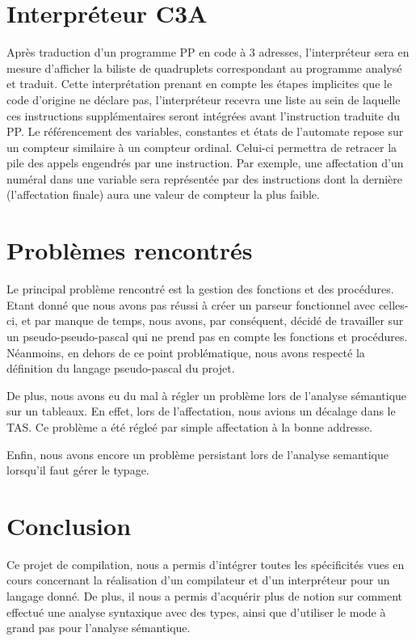\documentclass[11pt,a4paper]{article}
\begin{document}
\section{Interpréteur C3A}
Après traduction d'un programme PP en code à 3 adresses, l'interpréteur sera en mesure d'afficher la biliste de quadruplets correspondant au programme analysé et traduit.
Cette interprétation prenant en compte les étapes implicites que le code d'origine ne déclare pas, l'interpréteur recevra une liste au sein de laquelle ces instructions supplémentaires seront intégrées avant l'instruction traduite du PP.
Le référencement des variables, constantes et états de l'automate repose sur un compteur similaire à un compteur ordinal.
Celui-ci permettra de retracer la pile des appels engendrés par une instruction.
Par exemple, une affectation d'un numéral dans une variable sera représentée par des instructions dont la dernière (l'affectation finale) aura une valeur de compteur la plus faible.
\pagebreak
\section{Problèmes rencontrés}
Le principal problème rencontré est la gestion des fonctions et des procédures. Etant donné que nous avons pas réussi à créer un parseur fonctionnel avec celles-ci, et par manque de temps, nous avons, par conséquent, décidé de travailler sur un \og pseudo-pseudo-pascal \fg{} qui ne prend pas en compte les fonctions et procédures. Néanmoins, en dehors de ce point problématique, nous avons respecté la définition du langage pseudo-pascal du projet.
\par
De plus, nous avons eu du mal à régler un problème lors de l'analyse sémantique sur un tableaux. En effet, lors de l'affectation, nous avions un décalage dans le TAS. Ce problème a été régleé par simple affectation à la bonne addresse. 
\par 
Enfin, nous avons encore un problème persistant lors de l'analyse semantique lorsqu'il faut gérer le typage.
\pagebreak
\section{Conclusion}

Ce projet de compilation, nous a permis d'intégrer toutes les spécificités vues en cours concernant la réalisation d'un compilateur et d'un interpréteur pour un langage donné. De plus, il nous a permis d'acquérir plus de notion sur comment effectué une analyse syntaxique avec des types, ainsi que d'utiliser le mode à grand pas pour l'analyse sémantique. 
\end{document}
